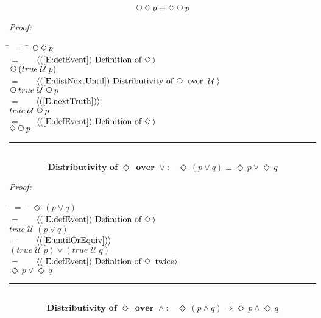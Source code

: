 \documentclass[fleqn, leqno]{article}
\newcommand{\lgap}{2pt} %
\newcommand{\mymathindent}{24pt} %
\newcommand{\Until}{\;\mathcal{U}\;}
\newcommand{\Next}{\;\,\text{\raisebox{3.5pt}{\circle{6}}}}
\newcommand{\Event}{\Diamond\,}
\newcommand{\myqed}{\hfill\rule[-.23ex]{1.2ex}{2.0ex}}
\newcommand{\Gll} {\langle} %
\newcommand{\Ggg} {\rangle} %
\newcommand{\Hint}[1] {\ \ \ $\Gll \mbox{#1} \Ggg$ } %
\begin{document}
\begin{equation}\label{E:dNextEvent}
\Next\Event p \equiv \Event\Next p
\end{equation}

\emph{Proof:}
\begin{tabbing}
\hspace{\mymathindent} \= $= \;$ \= \kill
\> \> $\Next\Event p$\\[\lgap]
\> $=$ \> \Hint{(\ref{E:defEvent}) Definition of $\Event$}\\[\lgap]
\> \> $\Next(true \Until p)$\\[\lgap]
\> $=$ \> \Hint{(\ref{E:distNextUntil}) Distributivity of $\Next$ over $\Until$}\\[\lgap]
\> \> $\Next true \Until \Next p$\\[\lgap]
\> $=$ \> \Hint{(\ref{E:nextTruth})}\\[\lgap]
\> \> $true \Until \Next p$\\[\lgap]
\> $=$ \> \Hint{(\ref{E:defEvent}) Definition of $\Event$}\\[\lgap]
\> \> $\Event\Next p$\\[\lgap]
\end{tabbing}
\myqed\\[\lgap]


\begin{equation}\label{E:distEventOr}
\textbf{Distributivity of $\Event$ over $\lor$:}\quad \Event(p \lor q) \equiv \Event p \lor \Event q
\end{equation}

\emph{Proof:}
\begin{tabbing}
\hspace{\mymathindent} \= $= \;$ \= \kill
\> \> $\Event(p \lor q)$\\[\lgap]
\> $=$ \> \Hint{(\ref{E:defEvent}) Definition of $\Event$}\\[\lgap]
\> \> $true \Until (p \lor q)$\\[\lgap]
\> $=$ \> \Hint{(\ref{E:untilOrEquiv})}\\[\lgap]
\> \> $(true \Until p) \lor (true \Until q)$\\[\lgap]
\> $=$ \> \Hint{(\ref{E:defEvent}) Definition of $\Event$ twice}\\[\lgap]
\> \> $\Event p \lor \Event q$\\[\lgap]
\end{tabbing}
\myqed\\[\lgap]


\begin{equation}\label{E:distEventAnd}
\textbf{Distributivity of $\Event$ over $\land$:}\quad \Event(p \land q) \Rightarrow \Event p \land \Event q
\end{equation}
\end{document}
